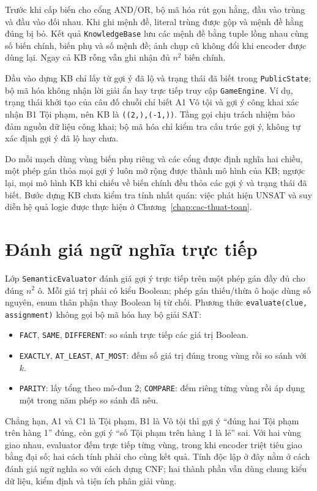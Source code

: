 Trước khi cấp biến cho cổng AND/OR, bộ mã hóa rút gọn hằng, đầu vào trùng và đầu vào đối nhau. Khi ghi mệnh đề, literal trùng được gộp và mệnh đề hằng đúng bị bỏ. Kết quả \texttt{KnowledgeBase} lưu các mệnh đề bằng tuple lồng nhau cùng số biến chính, biến phụ và số mệnh đề; ảnh chụp cũ không đổi khi encoder được dùng lại. Ngay cả KB rỗng vẫn ghi nhận đủ $n^2$ biến chính.

Đầu vào dựng KB chỉ lấy từ gợi ý đã lộ và trạng thái đã biết trong \texttt{PublicState}; bộ mã hóa không nhận lời giải ẩn hay trực tiếp truy cập \texttt{GameEngine}. Ví dụ, trạng thái khởi tạo của câu đố chuỗi chỉ biết A1 Vô tội và gợi ý công khai xác nhận B1 Tội phạm, nên KB là \texttt{((2,),(-1,))}. Tầng gọi chịu trách nhiệm bảo đảm nguồn dữ liệu công khai; bộ mã hóa chỉ kiểm tra cấu trúc gợi ý, không tự xác định gợi ý đã lộ hay chưa.

Do mỗi mạch dùng vùng biến phụ riêng và các cổng được định nghĩa hai chiều, một phép gán thỏa mọi gợi ý luôn mở rộng được thành mô hình của KB; ngược lại, mọi mô hình KB khi chiếu về biến chính đều thỏa các gợi ý và trạng thái đã biết. Bước dựng KB chưa kiểm tra tính nhất quán: việc phát hiện UNSAT và suy diễn hệ quả logic được thực hiện ở Chương~\ref{chap:cac-thuat-toan}.

\section{Đánh giá ngữ nghĩa trực tiếp}
\label{sec:danh-gia-ngu-nghia-truc-tiep}

Lớp \texttt{SemanticEvaluator} đánh giá gợi ý trực tiếp trên một phép gán đầy đủ cho đúng $n^2$ ô. Mỗi giá trị phải có kiểu Boolean; phép gán thiếu/thừa ô hoặc dùng số nguyên, enum thân phận thay Boolean bị từ chối. Phương thức \texttt{evaluate(clue, assignment)} không gọi bộ mã hóa hay bộ giải SAT:
\begin{itemize}
    \item \texttt{FACT}, \texttt{SAME}, \texttt{DIFFERENT}: so sánh trực tiếp các giá trị Boolean.
    \item \texttt{EXACTLY}, \texttt{AT\_LEAST}, \texttt{AT\_MOST}: đếm số giá trị đúng trong vùng rồi so sánh với $k$.
    \item \texttt{PARITY}: lấy tổng theo mô-đun 2; \texttt{COMPARE}: đếm riêng từng vùng rồi áp dụng một trong năm phép so sánh đã nêu.
\end{itemize}
Chẳng hạn, A1 và C1 là Tội phạm, B1 là Vô tội thì gợi ý ``đúng hai Tội phạm trên hàng 1'' đúng, còn gợi ý ``số Tội phạm trên hàng 1 là lẻ'' sai. Với hai vùng giao nhau, evaluator đếm trực tiếp từng vùng, trong khi encoder triệt tiêu giao bằng đại số; hai cách tính phải cho cùng kết quả. Tính độc lập ở đây nằm ở cách đánh giá ngữ nghĩa so với cách dựng CNF; hai thành phần vẫn dùng chung kiểu dữ liệu, kiểm định và tiện ích phân giải vùng.

